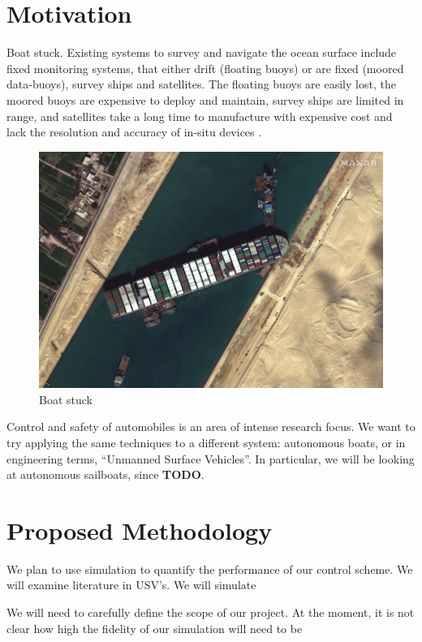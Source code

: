 \documentclass[conference]{IEEEtran}
\begin{document}
\section{Motivation}
Boat stuck. Existing systems to survey and navigate the ocean surface include fixed monitoring systems, that either drift (floating buoys) or are fixed (moored data-buoys), survey ships and satellites. The floating buoys are easily lost, the moored buoys are expensive to deploy and maintain, survey ships are limited in range, and satellites take a long time to manufacture with expensive cost and lack the resolution and accuracy of in-situ devices \cite{Sauzé2006}.
\begin{figure}
    \centering
    \includegraphics{documents/proposal/Suez_Canal_blocked_by_Ever_Given_March_27_2021.jpg}
    \caption{Boat stuck\label{fig:boat_stuck}}
\end{figure}
Control and safety of automobiles is an area of intense research focus. We want to try applying the same techniques to a different system: autonomous boats, or in engineering terms, \enquote{Unmanned Surface Vehicles}. In particular, we will be looking at autonomous sailboats, since \textbf{TODO}.

\section{Proposed Methodology}
We plan to use simulation to quantify the performance of our control scheme. We will examine literature in USV's.
We will simulate 

We will need to carefully define the scope of our project. At the moment, it is not clear how high the fidelity of our simulation will need to be 
\end{document}
